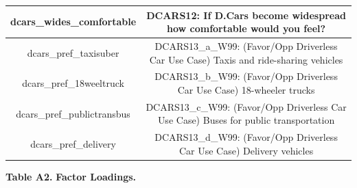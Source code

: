 {\begin{tabular}{c | c}
  \hline
  dcars\_wides\_comfortable & DCARS12: If D.Cars become widespread how comfortable would you feel? \\
  \hline
  dcars\_pref\_taxisuber & DCARS13\_a\_W99: (Favor/Opp Driverless Car Use Case) Taxis and ride-sharing vehicles \\
  \hline
  dcars\_pref\_18weeltruck & DCARS13\_b\_W99: (Favor/Opp Driverless Car Use Case) 18-wheeler trucks \\
  \hline
  dcars\_pref\_publictransbus & DCARS13\_c\_W99: (Favor/Opp Driverless Car Use Case) Buses for public transportation \\
  \hline
  dcars\_pref\_delivery & DCARS13\_d\_W99: (Favor/Opp Driverless Car Use Case) Delivery vehicles \\
  \hline
\end{tabular}
}

\textbf{Table A2. }\textbf{Factor Loadings}\textbf{.}

